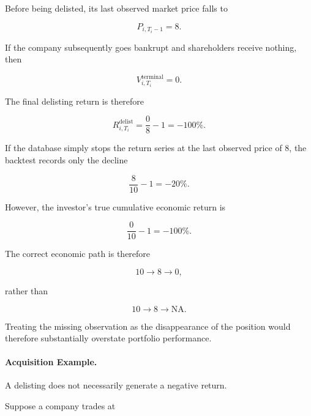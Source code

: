\documentclass[11pt,a4paper]{article}
\begin{document}
Before being delisted, its last observed market price falls to

\begin{equation}
P_{i,T_i-1}=8.
\end{equation}

If the company subsequently goes bankrupt and shareholders receive nothing,
then

\begin{equation}
V_{i,T_i}^{\mathrm{terminal}}=0.
\end{equation}

The final delisting return is therefore

\begin{equation}
R_{i,T_i}^{\mathrm{delist}}
=
\frac{0}{8}-1
=
-100\%.
\end{equation}

If the database simply stops the return series at the last observed price of
$8$, the backtest records only the decline

\begin{equation}
\frac{8}{10}-1
=
-20\%.
\end{equation}

However, the investor's true cumulative economic return is

\begin{equation}
\frac{0}{10}-1
=
-100\%.
\end{equation}

The correct economic path is therefore

\begin{equation}
\boxed{
10
\longrightarrow
8
\longrightarrow
0,
}
\end{equation}

rather than

\begin{equation}
10
\longrightarrow
8
\longrightarrow
\mathrm{NA}.
\end{equation}

Treating the missing observation as the disappearance of the position would
therefore substantially overstate portfolio performance.


\paragraph{Acquisition Example.}

A delisting does not necessarily generate a negative return.

Suppose a company trades at
\end{document}
